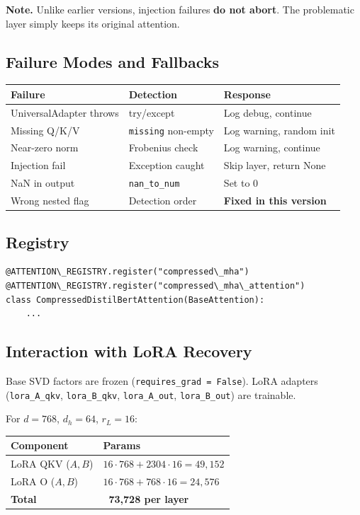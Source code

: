 \textbf{Note.} Unlike earlier versions, injection failures \textbf{do not abort}. 
The problematic layer simply keeps its original attention.

\subsection{Failure Modes and Fallbacks}

\begin{table}[H]
\centering
\small
\begin{tabular}{lll}
\toprule
\textbf{Failure} & \textbf{Detection} & \textbf{Response} \\
\midrule
UniversalAdapter throws & try/except & Log debug, continue \\
Missing Q/K/V & \texttt{missing} non-empty & Log warning, random init \\
Near-zero norm & Frobenius check & Log warning, continue \\
Injection fail & Exception caught & Skip layer, return None \\
NaN in output & \texttt{nan\_to\_num} & Set to 0 \\
Wrong nested flag & Detection order & \textbf{Fixed in this version} \\
\bottomrule
\end{tabular}
\end{table}

\subsection{Registry}

\begin{lstlisting}
@ATTENTION\_REGISTRY.register("compressed\_mha")
@ATTENTION\_REGISTRY.register("compressed\_mha\_attention")
class CompressedDistilBertAttention(BaseAttention):
    ...
\end{lstlisting}

\subsection{Interaction with LoRA Recovery}

Base SVD factors are frozen (\texttt{requires\_grad = False}). LoRA adapters 
(\texttt{lora\_A\_qkv}, \texttt{lora\_B\_qkv}, \texttt{lora\_A\_out}, \texttt{lora\_B\_out}) are trainable.

For $d = 768$, $d_h = 64$, $r_L = 16$:

\begin{table}[H]
\centering
\small
\begin{tabular}{ll}
\toprule
\textbf{Component} & \textbf{Params} \\
\midrule
LoRA QKV ($A, B$) & $16 \cdot 768 + 2304 \cdot 16 = 49,152$ \\
LoRA O ($A, B$) & $16 \cdot 768 + 768 \cdot 16 = 24,576$ \\
\textbf{Total} & \textbf{~73,728 per layer} \\
\bottomrule
\end{tabular}
\end{table}

